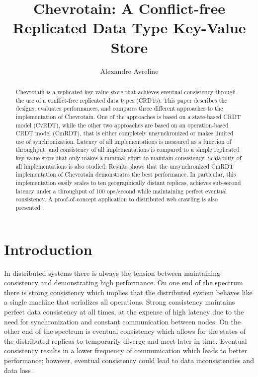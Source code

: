 \documentclass[sigconf,nonacm,10pt]{acmart}
\begin{document}
\title{Chevrotain: A Conflict-free Replicated Data Type Key-Value Store}

\author{Alexandre Avreline}

\begin{abstract}
Chevrotain is a replicated key value store that achieves eventual consistency through the use of a conflict-free replicated data types (CRDTs). This paper describes the designs, evaluates performances, and compares three different approaches to the implementation of Chevrotain. One of the approaches is based on a state-based CRDT model (CvRDT), while the other two approaches are based on an operation-based CRDT model (CmRDT), that is either completely unsynchronized or makes limited use of synchronization. Latency of all implementations is measured as a function of throughput, and consistency of all implementations is compared to a simple replicated key-value store that only makes a minimal effort to maintain consistency. Scalability of all implementations is also studied. Results shows that the unsynchronized CmRDT implementation of Chevrotain demonstrates the best performance. In particular, this implementation easily scales to ten geographically distant replicas, achieves sub-second latency under a throughput of 100 ops/second while maintaining perfect eventual consistency. A proof-of-concept application to distributed web crawling is also presented.\end{abstract}


\maketitle

\section{Introduction}

In distributed systems there is always the tension between maintaining consistency and demonstrating high performance. On one end of the spectrum there is strong consistency which implies that the distributed system behaves like a single machine that serializes all operations. Strong consistency maintains perfect data consistency at all times, at the expense of high latency due to the need for synchronization and constant communication between nodes. On the other end of the spectrum is eventual consistency which allows for the states of the distributed replicas to temporarily diverge and meet later in time. Eventual consistency results in a lower frequency of communication which leads to better performance; however, eventual consistency could lead to data inconsistencies and data loss \cite{li2012making}. 
\end{document}
